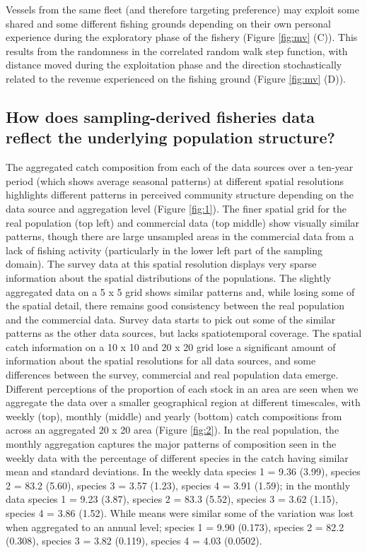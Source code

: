 \documentclass[review]{elsarticle}
\begin{document}
Vessels from the same fleet (and therefore targeting preference) may exploit
some shared and some different fishing grounds depending on their own personal
experience during the exploratory phase of the fishery (Figure \ref{fig:mv} (C)).
This results from the randomness in the correlated random walk step function,
with distance moved during the exploitation phase and the direction
stochastically related to the revenue experienced on the fishing ground (Figure
\ref{fig:mv} (D)). 

\subsection{How does sampling-derived fisheries data reflect the underlying
	population structure?}

The aggregated catch composition from each of the data sources over a ten-year
period (which shows average seasonal patterns) at different spatial resolutions
highlights different patterns in perceived community structure depending on the
data source and aggregation level (Figure \ref{fig:1}). The finer spatial grid
for the real population (top left) and commercial data (top middle) show
visually similar patterns, though there are large unsampled areas in the
commercial data from a lack of fishing activity (particularly in the lower left
part of the sampling domain). The survey data at this spatial resolution
displays very sparse information about the spatial distributions of the
populations. The slightly aggregated data on a 5 x 5 grid shows similar
patterns and, while losing some of the spatial detail, there remains good
consistency between the real population and the commercial data. Survey data
starts to pick out some of the similar patterns as the other data sources, but
lacks spatiotemporal coverage. The spatial catch information on a 10 x 10 and
20 x 20 grid lose a significant amount of information about the spatial
resolutions for all data sources, and some differences between the survey,
commercial and real population data emerge. \\

Different perceptions of the proportion of each stock in an area are seen when
we aggregate the data over a smaller geographical region at different
timescales, with weekly (top), monthly (middle) and yearly (bottom) catch
compositions from across an aggregated 20 x 20 area (Figure \ref{fig:2}). In
the real population, the monthly aggregation captures the major patterns of
composition seen in the weekly data with the percentage of different species in
the catch having similar mean and standard deviations.  In the weekly data
species 1 = 9.36 (3.99), species 2 = 83.2 (5.60), species 3 = 3.57 (1.23),
species 4 = 3.91 (1.59); in the monthly data species 1 = 9.23 (3.87), species 2
= 83.3 (5.52), species 3 = 3.62 (1.15), species 4 = 3.86 (1.52). While means
were similar some of the variation was lost when aggregated to an annual level;
species 1 = 9.90 (0.173), species 2 = 82.2 (0.308), species 3 = 3.82 (0.119),
species 4 = 4.03 (0.0502).\\
\end{document}
